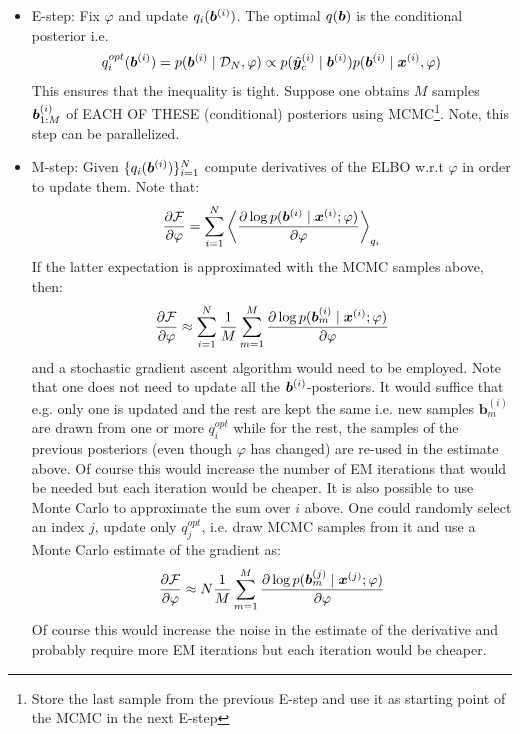 \begin{itemize}
	\item E-step: Fix $\varphi$ and update $q_i(\boldsymbol{b}^{(i)})$. The optimal $q(\boldsymbol{b})$ is the conditional posterior i.e.   
	\begin{align}
		q_i^{opt}(\bm b^{(i)}) = p(\bm b^{(i)}\mid\mathcal{D}_N, \varphi) \propto p(\hat{\boldsymbol{y}}_c^{(i)} \mid \bm b^{(i)}) p(\bm b^{(i)} \mid \bm x^{(i)}, \varphi)
	\end{align}
	This ensures that the inequality is tight. Suppose one obtains $M$  samples $\boldsymbol{b}^{(i)}_{1:M}$ of EACH OF THESE (conditional) posteriors using MCMC\footnote{Store the last sample from the previous E-step and use it as starting point of the MCMC in the next E-step}. Note, this step can be parallelized. 
	\item M-step: Given $\{q_i(\boldsymbol{b}^{(i)})\}_{i=1}^N$ compute derivatives of the ELBO w.r.t $\varphi$ in order to update them. Note that:
	\begin{align}
	\frac{\partial \mathcal{F} }{\partial \varphi} = \sum_{i=1}^N \left< \frac{\partial \log p(\bm b^{(i)}\mid\bm{ x}^{(i)};\varphi)}{\partial \varphi} \right>_{q_i}
	\end{align}
	If the latter expectation is approximated with the MCMC samples above, then:
	\begin{align}
	\frac{\partial \mathcal{F}}{\partial \varphi}  \approx \sum_{i=1}^N \frac{1}{M} \sum_{m=1}^M  \frac{\partial \log p(\bm{b}_m^{(i)}\mid\bm x^{(i)};\varphi)}{\partial \varphi} 
	\end{align}
	and a stochastic gradient ascent algorithm would need to be employed.
	Note that one does not need to update all the $\boldsymbol{b}^{(i)}$-posteriors. It would suffice that e.g. only one is updated and the rest are kept the same \cite{neal1998view} i.e. new samples $\bm{b}_m^{(i)}$ are drawn from one or more $q_i^{opt}$ while for the rest, the samples of the previous posteriors (even though $\varphi$ has changed) are re-used in the estimate above. Of course this would increase the number of EM iterations that would be needed but each iteration would be cheaper.
	It is also possible to use Monte Carlo to approximate the sum over $i$ above. One could randomly select an index $j$, update only  $q_j^{opt}$, i.e. draw MCMC samples from it and use a Monte Carlo estimate of the gradient as:
	\begin{align}
	\frac{\partial \mathcal{F}}{\partial \varphi} \approx N  \frac{1}{M} \sum_{m=1}^M  \frac{\partial \log p(\bm{b}_m^{(j)}\mid\bm x^{(j)};\varphi)}{\partial \varphi} 
	\end{align}
	Of course this would increase the noise  in the estimate of the derivative and  probably require more EM iterations  but each iteration would be cheaper.
\end{itemize}








